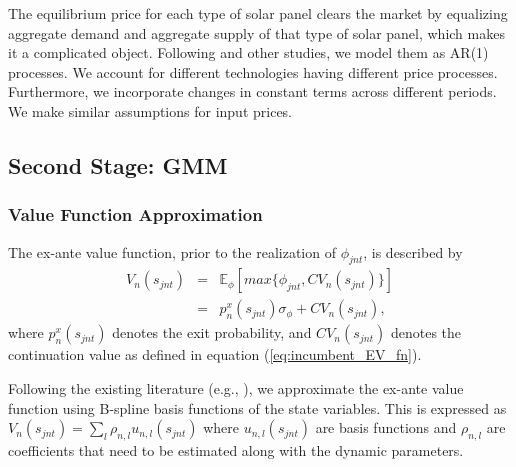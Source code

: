 \documentclass[12pt, letter]{article}
\begin{document}
The equilibrium price for each type of solar panel clears the market by equalizing aggregate demand and aggregate supply of that type of solar panel, which makes it a complicated object. Following \citet{barwick2025industrial} and other studies, we model them as AR(1) processes. We account for different technologies having different price processes. Furthermore, we incorporate changes in constant terms across different periods. We make similar assumptions for input prices. 

\subsection{Second Stage: GMM}
\label{subsec:est_dynamic_second}

\subsubsection{Value Function Approximation}
The ex-ante value function, prior to the realization of $\phi_{jnt}$, is described by
\begin{eqnarray}
    V_n(s_{jnt}) & = & \mathbb{E}_\phi[ max\{\phi_{jnt},CV_n(s_{jnt})\}] \nonumber \\
    & = &  p_n^x(s_{jnt}) \sigma_\phi + CV_n(s_{jnt}), \label{eq:est_bellman}
\end{eqnarray}
where $p_n^x(s_{jnt})$ denotes the exit probability, and $CV_n(s_{jnt})$ denotes the continuation value as defined in equation (\ref{eq:incumbent_EV_fn}).

Following the existing literature (e.g., \citet{sweeting2013dynamic}), we approximate the ex-ante value function using B-spline basis functions of the state variables. This is expressed as $V_n(s_{jnt}) = \sum_l \rho_{n,l} u_{n,l}(s_{jnt})$ where $u_{n,l}(s_{jnt})$ are basis functions and $\rho_{n,l}$ are coefficients that need to be estimated along with the dynamic parameters.
\end{document}
